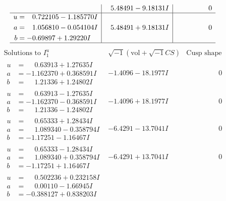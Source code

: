 \documentclass[1p]{elsarticle_modified}
\theoremstyle{definition}
\newcommand{\I}{\sqrt{-1}}
\begin{document}
$$\begin{array}{c|c|c}
 & \phantom{-}5.48491 - 9.18131 I & \phantom{-0.000000 } 0 \\ \hline\begin{aligned}
u &= \phantom{-}0.722105 - 1.185770 I \\
a &= \phantom{-}1.056810 - 0.054104 I \\
b &= -0.69897 + 1.29220 I\end{aligned}
 & \phantom{-}5.48491 + 9.18131 I & \phantom{-0.000000 } 0\\
 \hline 
 \end{array}$$\newpage$$\begin{array}{c|c|c}  
\text{Solutions to }I^u_{1}& \I (\text{vol} + \sqrt{-1}CS) & \text{Cusp shape}\\
 \hline 
\begin{aligned}
u &= \phantom{-}0.63913 + 1.27635 I \\
a &= -1.162370 + 0.368591 I \\
b &= \phantom{-}1.21336 + 1.24802 I\end{aligned}
 & -1.4096 - 18.1977 I & \phantom{-0.000000 } 0 \\ \hline\begin{aligned}
u &= \phantom{-}0.63913 - 1.27635 I \\
a &= -1.162370 - 0.368591 I \\
b &= \phantom{-}1.21336 - 1.24802 I\end{aligned}
 & -1.4096 + 18.1977 I & \phantom{-0.000000 } 0 \\ \hline\begin{aligned}
u &= \phantom{-}0.65333 + 1.28434 I \\
a &= \phantom{-}1.089340 - 0.358794 I \\
b &= -1.17251 - 1.16467 I\end{aligned}
 & -6.4291 - 13.7041 I & \phantom{-0.000000 } 0 \\ \hline\begin{aligned}
u &= \phantom{-}0.65333 - 1.28434 I \\
a &= \phantom{-}1.089340 + 0.358794 I \\
b &= -1.17251 + 1.16467 I\end{aligned}
 & -6.4291 + 13.7041 I & \phantom{-0.000000 } 0 \\ \hline\begin{aligned}
u &= \phantom{-}0.502236 + 0.232158 I \\
a &= \phantom{-}0.00110 - 1.66945 I \\
b &= -0.388127 + 0.838203 I\end{aligned}

\end{array}$$
\end{document}
